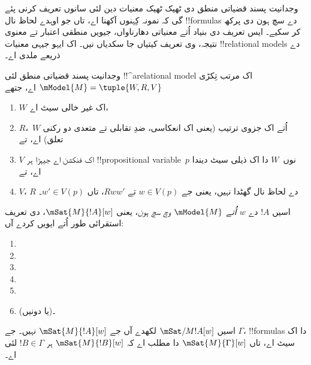 \documentclass[../../../include/open-logic-section]{subfiles}
\begin{document}


وجدانیت پسند قضیاتی منطق دی ٹھیک ٹھیک معنیات دین لئی سانوں تعریف کرنی پئے گی
کہ نمونہ کِہنوں آکھنا اے، تاں جو اوہدے لحاظ نال !!{formula}s دے سچ ہون دی پرکھ
کر سکیے۔ ایس تعریف دی بنیاد اُتے معنیاتی دھارناواں، جیویں منطقی اعتبار تے معنوی
نتیجہ، وی تعریف کیتیاں جا سکدیاں نیں۔ اک ایہو جیہی معنیات !!{relational model}s
دے ذریعے ملدی اے۔

\begin{defn}
  وجدانیت پسند قضیاتی منطق لئی !!^a{relational model} اک مرتب تِکڑی
  $\mModel{M} = \tuple{W, R, V}$ اے، جتھے
  \begin{enumerate}
  \item $W$ اک غیر خالی سیٹ اے،
  \item $R$،~$W$ اُتے اک جزوی ترتیب (یعنی اک انعکاسی، ضدِ تقابلی تے متعدی دو رکنی تعلق) اے، تے
  \item $V$ اک فنکشن اے جیہڑا ہر !!{propositional
    variable}~$p$ نوں~$W$ دا اک ذیلی سیٹ دیندا اے، تے
  \item $V$، $R$ دے لحاظ نال گھٹدا نہیں، یعنی جے $w
    \in V(p)$ تے $Rww'$، تاں $w' \in V(p)$۔
  \end{enumerate}
\end{defn}

\begin{defn}
  اسیں $!A$ دے \emph{$w$ اُتے $\mModel{M}$ وچ سچ ہون}، یعنی
  $\mSat{M}{!A}[w]$، دی تعریف استقرائی طور اُتے ایویں کردے آں:
  \begin{enumerate}
  \item {}
  \item {}
  \item {}
  \item {}
  \item {}
  \item {} (یا دونیں)۔
  \end{enumerate}
  اسیں $\mSat/{M}{!A}[w]$ لکھدے آں جے $\mSat{M}{!A}[w]$ نہیں۔ جے $\Gamma$،
  !!{formula}s دا اک سیٹ اے، تاں $\mSat{M}{\Gamma}[w]$ دا مطلب اے کہ
  $\mSat{M}{!B}[w]$ ہر $!B \in \Gamma$ لئی اے۔
\end{defn}
\end{document}
